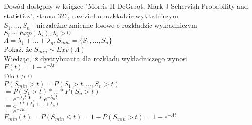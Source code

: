 \documentclass[a4paper,14pt]{report}
\begin{document}
    \begin{center}
        Dowód dostępny w ksiązce "Morris H DeGroot, Mark J Schervish-Probability and statistics", strona 323, rozdział o rozkładzie wykładniczym \\
        $S_{1},...,S_{n}$ - niezależne zmienne losowe o rozkładzie wykładniczym \\ 
        $S_{i} \sim Exp( \lambda_{i}), \lambda_{i} > 0$ \\
        $\Lambda = \lambda_{1} + ... + \lambda_{n}, S_{min} = \{S_{1},...,S_{n}\} $ \\
        Pokaż, że $S_{min} \sim Exp(\Lambda)$ 
        \\
        Wiedząc, iż dystrybuanta dla rozkładu wykładniczego wynosi \\
        $F(t) = 1-e^{- \lambda t}$ \\
        Dla $ t > 0 $ \\
        $P(S_{min} > t) = P(S_{1} > t , ... , S_{n} > t)$ \\
        $ = P(S_{1} > t) * ... * P(S_{n} > t)$ \\
        $ = e^{- \lambda_{1} t} * ... * e^{- \lambda_{n} t}$ \\
        $ = e^{-t * (\lambda_{1} + ... + \lambda_{n})} $ \\
        $ = e^{- \Lambda t} $ \\
        $F_{min}(t) = P(S_{min} \leq t) = 1 - P(S_{min} > t) = 1 - e^{- \Lambda t} $\\

    \end{center}
\end{document}
